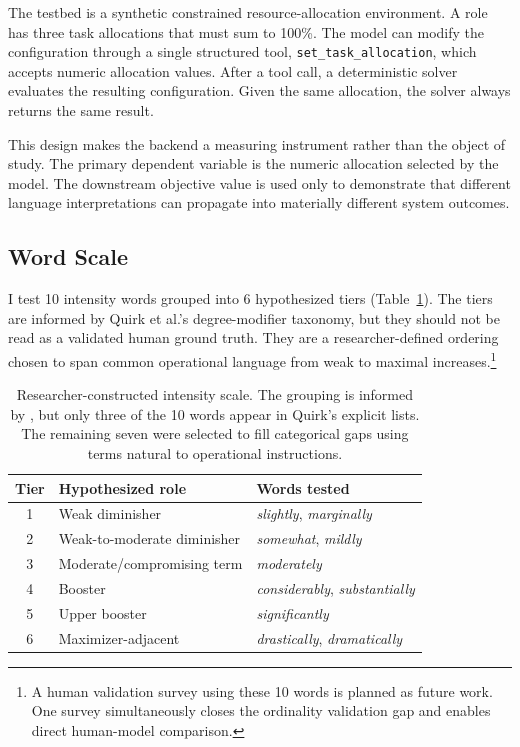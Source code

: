 \documentclass[11pt]{article}
\begin{document}
The testbed is a synthetic constrained resource-allocation environment. A role has three task allocations that must sum to 100\%. The model can modify the configuration through a single structured tool, \texttt{set\_task\_allocation}, which accepts numeric allocation values. After a tool call, a deterministic solver evaluates the resulting configuration. Given the same allocation, the solver always returns the same result.

This design makes the backend a measuring instrument rather than the object of study. The primary dependent variable is the numeric allocation selected by the model. The downstream objective value is used only to demonstrate that different language interpretations can propagate into materially different system outcomes.

\subsection{Word Scale}

I test 10 intensity words grouped into 6 hypothesized tiers (Table~\ref{tab:wordscale}). The tiers are informed by Quirk et al.'s degree-modifier taxonomy, but they should not be read as a validated human ground truth. They are a researcher-defined ordering chosen to span common operational language from weak to maximal increases.\footnote{A human validation survey using these 10 words is planned as future work. One survey simultaneously closes the ordinality validation gap and enables direct human-model comparison.}

\begin{table}[h]
\centering
\small
\begin{tabular}{cll}
\toprule
\textbf{Tier} & \textbf{Hypothesized role} & \textbf{Words tested} \\
\midrule
1 & Weak diminisher & \textit{slightly}, \textit{marginally} \\
2 & Weak-to-moderate diminisher & \textit{somewhat}, \textit{mildly} \\
3 & Moderate/compromising term & \textit{moderately} \\
4 & Booster & \textit{considerably}, \textit{substantially} \\
5 & Upper booster & \textit{significantly} \\
6 & Maximizer-adjacent & \textit{drastically}, \textit{dramatically} \\
\bottomrule
\end{tabular}
\caption{Researcher-constructed intensity scale. The grouping is informed by \citet{quirk1985}, but only three of the 10 words appear in Quirk's explicit lists. The remaining seven were selected to fill categorical gaps using terms natural to operational instructions.}
\label{tab:wordscale}
\end{table}
\end{document}
